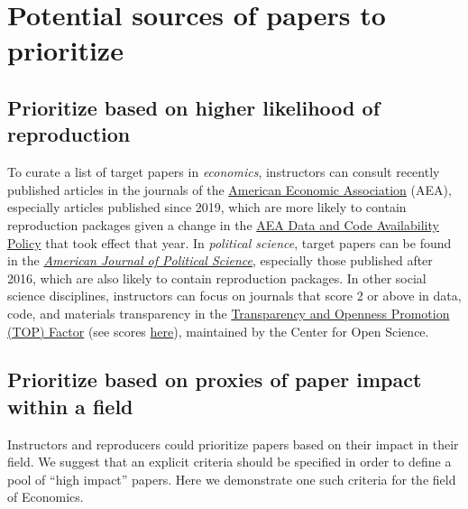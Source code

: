 \documentclass[
  openany]{book}
\begin{document}
\hypertarget{identify-timeline}{%
\section{Potential sources of papers to prioritize}\label{identify-timeline}}

\hypertarget{prioritize-based-on-higher-likelihood-of-reproduction}{%
\subsection{Prioritize based on higher likelihood of reproduction}\label{prioritize-based-on-higher-likelihood-of-reproduction}}

To curate a list of target papers in \emph{economics}, instructors can consult recently published articles in the journals of the \href{https://www.aeaweb.org/journals}{American Economic Association} (AEA), especially articles published since 2019, which are more likely to contain reproduction packages given a change in the \href{https://www.aeaweb.org/journals/data/data-code-policy}{AEA Data and Code Availability Policy} that took effect that year. In \emph{political science}, target papers can be found in the \emph{\href{https://ajps.org/ajps-verification-policy/}{American Journal of Political Science}}, especially those published after 2016, which are also likely to contain reproduction packages. In other social science disciplines, instructors can focus on journals that score 2 or above in data, code, and materials transparency in the \href{https://www.cos.io/initiatives/top-guidelines}{Transparency and Openness Promotion (TOP) Factor} (see scores \href{https://topfactor.org/}{here}), maintained by the Center for Open Science.

\hypertarget{prioritize-based-on-proxies-of-paper-impact-within-a-field}{%
\subsection{Prioritize based on proxies of paper impact within a field}\label{prioritize-based-on-proxies-of-paper-impact-within-a-field}}

Instructors and reproducers could prioritize papers based on their impact in their field. We suggest that an explicit criteria should be specified in order to define a pool of ``high impact'' papers. Here we demonstrate one such criteria for the field of Economics.
\end{document}
